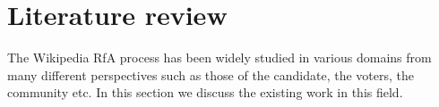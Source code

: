 \section{Literature review}
\label{sec:literature-review}

The Wikipedia RfA process has been widely studied in various domains from many different perspectives such as those of the candidate, the voters, the community etc. In this section we discuss the existing work in this field.
\smallskip


